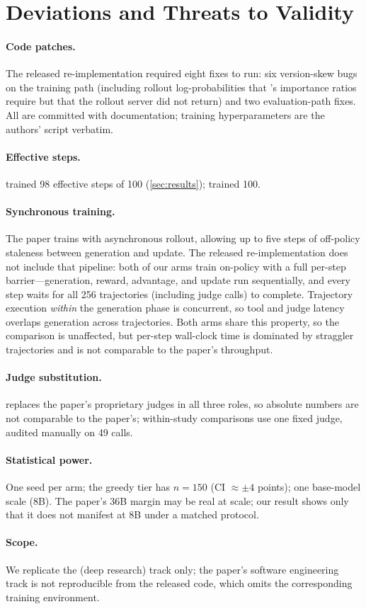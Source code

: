 \section{Deviations and Threats to Validity}
\label{sec:threats}

\paragraph{Code patches.} The released re-implementation required eight fixes to run: six
version-skew bugs on the training path (including rollout log-probabilities that \foldgrpo{}'s
importance ratios require but that the rollout server did not return) and two evaluation-path
fixes. All are committed with documentation; training hyperparameters are the authors' script
verbatim.

\paragraph{Effective steps.} \grpo{} trained 98 effective steps of 100
(\cref{sec:results}); \foldgrpo{} trained 100.

\paragraph{Synchronous training.} The paper trains with asynchronous rollout, allowing up to
five steps of off-policy staleness between generation and update. The released
re-implementation does not include that pipeline: both of our arms train on-policy with a full
per-step barrier---generation, reward, advantage, and update run sequentially, and every step
waits for all 256 trajectories (including judge calls) to complete. Trajectory execution
\emph{within} the generation phase is concurrent, so tool and judge latency overlaps
generation across trajectories. Both arms share this property, so the comparison is
unaffected, but per-step wall-clock time is dominated by straggler trajectories and is not
comparable to the paper's throughput.

\paragraph{Judge substitution.} \judgemodel{} replaces the paper's proprietary judges in all
three roles, so absolute numbers are not comparable to the paper's; within-study comparisons
use one fixed judge, audited manually on 49 calls.

\paragraph{Statistical power.} One seed per arm; the greedy tier has $n{=}150$ (CI
$\approx \pm 4$ points); one base-model scale (8B). The paper's 36B margin may be real at scale;
our result shows only that it does not manifest at 8B under a matched protocol.

\paragraph{Scope.} We replicate the \bcplus{} (deep research) track only; the paper's software
engineering track is not reproducible from the released code, which omits the corresponding
training environment.
